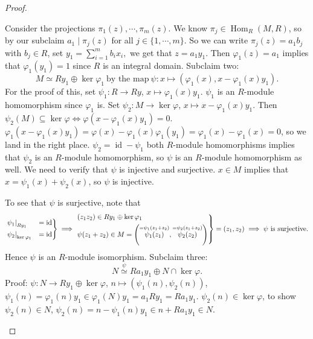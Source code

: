 \begin{proof}
\begin{claim}
       Consider the projections $\pi_1(z),\cdots ,\pi_m(z)$. We know $\pi_j \in \operatorname{Hom}_R(M,R)$, so by our subclaim $a_1 \mid \pi_j (z)$ for all $j\in \{1,\cdots ,m\} $. So we can write $\pi_j (z)=a_1b_j $ with $b_j \in R$, set $y_1=\sum_{i=1}^{m} b_i x_i ,$ we get that $z=a_1y_1$. Then $\varphi_1(z) =a_1$ implies that $\varphi_1(y_1)=1$ since $R$ is an integral domain. Subclaim two: \[
           M\simeq Ry_1\oplus \ker \varphi_1 \ \text{by the map} \ \psi \colon x \mapsto \left( \varphi_1(x), x-\varphi_1(x)y_1  \right) . 
       \] For the proof of this, set $\psi_1 \colon R \to Ry$, $x\mapsto \varphi_1(x)y_1 $. $\psi_1$ is an $R$-module homomorphism since $\varphi_1 $ is. Set $\psi_2 \colon M \to \ker \varphi  $, $x\mapsto x-\varphi_1(x)y_1 $. Then $\psi_2(M)\subseteq \ker \varphi \iff \varphi (x-\varphi_1(x)y_1)=0 $. $\varphi_1(x-\varphi_1(x)y_1)=\varphi (x)-\varphi_1(x)\varphi_1(y_1)=\varphi_1(x)-\varphi_1(x)=0      $, so we land in the right place. $\psi_2=\operatorname{id}-\psi_1$ both $R$-module homomorphisms implies that $\psi_2$ is an $R$-module homomorphism, so $\psi$ is an $R$-module homomorphism as well. We need to verify that $\psi$ is injective and surjective. $x\in M$ implies that $x=\psi_1(x)+\psi_2(x)$, so $\psi $ is injective. 

           To see that $\psi$ is surjective, note that \[
           \begin{rcases}
               \left. \psi_1 \right| _{Ry_1}&=\operatorname{id}\\
                   \left. \psi_2 \right| _{\ker \varphi_1 }&=\operatorname{id}
           \end{rcases}\implies 
           \begin{rcases}
               (z_1z_{2})\in Ry_1\oplus\ker \varphi_1 \\
               \psi(z_1+z_2)\in M=\left( \overset{=\psi_1(z_1+z_2)}{\psi_1(z_1)} ,\overset{=\psi_2(z_1+z_2)}{\psi_2(z_2)}  \right) 
           \end{rcases}=(z_1,z_2)\implies \psi \ \text{is surjective.}  
           \] Hence $\psi$ is an $R$-module isomorphism. Subclaim three: \[
           N \overset{\psi}{\simeq} Ra_1y_1\oplus N\cap \ker \varphi .
       \]Proof: $\psi \colon N \to Ry_1\oplus \ker \varphi $, $n\mapsto (\psi_1(n),\psi_2(n))$, $\psi_1(n)=\varphi_1(n)y_1\in \varphi_1(N)y_1=a_1Ry_1=Ra_1y_1  $. $\psi_2(n) \in \ker \varphi $, to show $\psi_2(n)\in N$, $\psi_2(n)=n-\psi_1(n)y_1\in n+Ra_1y_1\in N$.
\end{claim}
\end{proof}
